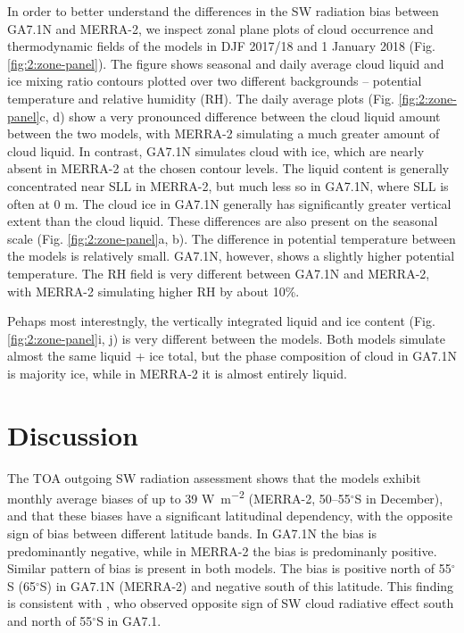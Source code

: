 In order to better understand the differences in the SW radiation bias between
GA7.1N and MERRA-2, we inspect zonal plane plots of cloud occurrence and
thermodynamic fields of the models in DJF 2017/18 and 1 January 2018 (Fig.
\ref{fig:2:zone-panel}). The figure shows seasonal and daily average cloud liquid
and ice mixing ratio contours plotted over two different backgrounds --
potential temperature and relative humidity (RH). The daily average plots
(Fig. \ref{fig:2:zone-panel}c, d) show a very pronounced difference between
the cloud liquid amount between the two models, with MERRA-2 simulating a much
greater amount of cloud liquid. In contrast, GA7.1N simulates cloud with ice,
which are nearly absent in MERRA-2 at the chosen contour levels. The liquid
content is generally concentrated near SLL in MERRA-2, but much less so in GA7.1N,
where SLL is often at 0 m. The cloud ice in GA7.1N generally has significantly
greater vertical extent than the cloud liquid. These differences are also
present on the seasonal scale (Fig. \ref{fig:2:zone-panel}a, b). The difference
in potential temperature between the models is relatively small. GA7.1N, however,
shows a slightly higher potential temperature.
The RH field is very different between GA7.1N and MERRA-2, with MERRA-2
simulating higher RH by about 10\%.

Pehaps most interestngly, the vertically integrated liquid and ice content
(Fig. \ref{fig:2:zone-panel}i, j) is very different between the models. Both
models simulate almost the same liquid + ice total, but the phase composition
of cloud in GA7.1N is majority ice, while in MERRA-2 it is almost entirely
liquid.

\section{Discussion}

The TOA outgoing SW radiation assessment shows that the models exhibit monthly
average biases of up to 39 \unit{W m^{-2}} (MERRA-2, 50--55$^\circ$S in
December), and that these biases have a significant latitudinal dependency,
with the opposite sign of bias between different latitude bands. In GA7.1N the
bias is predominantly negative, while in MERRA-2 the bias is predominanly
positive. Similar pattern of bias is present in both models. The bias is positive
north of 55$^\circ$S (65$^\circ$S) in GA7.1N (MERRA-2) and negative south of
this latitude.
This finding is consistent with \cite{schuddeboom2019}, who observed opposite
sign of SW cloud radiative effect south and north of 55$^\circ$S in GA7.1.

